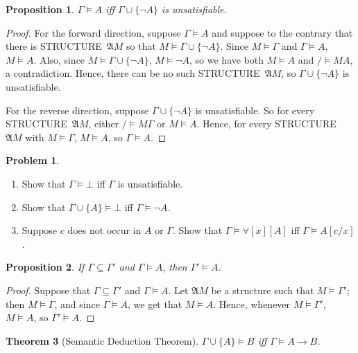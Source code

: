 \documentclass[10pt,a4paper]{article}
\newcommand*{\olup}[1]{\MakeUppercase{#1}}
\theoremstyle{plain}
\newtheorem{thm}{Theorem}[section]
\newtheorem{prop}[thm]{Proposition}
\theoremstyle{definition}
\newtheorem{prob}{Problem}[section]
\theoremstyle{remark}
\newcommand*{\ollabel}[1]{\label{#1}}
\providecommand{\lif}{\mathbin{\rightarrow}}
\providecommand{\lforall}{\mathord{\forall}}
\providecommand{\Entails}{\mathrel{\models}}
\providecommand{\Subst}[3]{#1[#2/#3]}
\providecommand{\Struct}{\ensuremath{\mathfrak{A}}}
\providecommand{\Sat}[2]{\ensuremath{#1 \models #2}}
\begin{document}
\begin{prop}
\ollabel{prop:entails-unsat}
$\Gamma \Entails A$ iff $\Gamma \cup \{\lnot A\}$ is unsatisfiable.
\end{prop}

\begin{proof}
For the forward direction, suppose $\Gamma \Entails A$ and suppose to the
contrary that there is \olup{structure}~$\Struct M$ so that $\Sat{M}{\Gamma
  \cup \{ \lnot A \}}$. Since $\Sat{M}{\Gamma}$ and $\Gamma \Entails
A$, $\Sat{M}{A}$. Also, since $\Sat{M}{\Gamma\cup \{ \lnot A \}}$,
$\Sat{M}{\lnot A}$, so we have both $\Sat{M}{A}$ and $\Sat/{M}{A}$,
a contradiction. Hence, there can be no such \olup{structure}~$\Struct M$, so
$\Gamma \cup \{ \lnot A \}$ is unsatisfiable.

For the reverse direction, suppose $\Gamma \cup \{ \lnot A \}$ is
unsatisfiable. So for every \olup{structure}~$\Struct M$, either
$\Sat/{M}{\Gamma}$ or $\Sat{M}{A}$. Hence, for every \olup{structure}
$\Struct M$ with $\Sat{M}{\Gamma}$, $\Sat{M}{A}$, so $\Gamma \Entails
A$.
\end{proof}

\begin{prob}
\begin{enumerate}
\item Show that $\Gamma \Entails \bot$ iff $\Gamma$ is unsatisfiable.
\item Show that $\Gamma \cup \{A\} \Entails \bot$ iff $\Gamma \Entails \lnot A$.
\item Suppose $c$ does not occur in $A$ or $\Gamma$.  Show that
  $\Gamma \Entails \lforall[x][A]$ iff $\Gamma \Entails
  \Subst{A}{c}{x}$.
\end{enumerate}
\end{prob}

\begin{prop}
If $\Gamma \subseteq \Gamma'$ and $\Gamma \Entails A$, then $\Gamma'
\Entails A$.
\end{prop}

\begin{proof}
Suppose that $\Gamma \subseteq \Gamma'$ and $\Gamma \Entails A$. Let
$\Struct M$ be a structure such that $\Sat{M}{\Gamma'}$; then $\Sat{M}{\Gamma}$,
and since $\Gamma \Entails A$, we get that $\Sat{M}{A}$. Hence,
whenever $\Sat{M}{\Gamma'}$, $\Sat{M}{A}$, so $\Gamma' \Entails A$.
\end{proof}


\begin{thm}[Semantic Deduction Theorem]
\ollabel{thm:sem-deduction}
$\Gamma \cup \{A\} \Entails B$ iff $\Gamma \Entails A \lif B$.
\end{thm}
\end{document}
